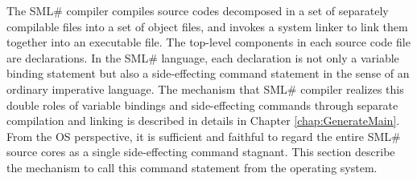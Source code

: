 \documentclass{jbook}
\newcommand{\smlsharp}{SML\#}
\begin{document}
	The \smlsharp{} compiler compiles source codes decomposed in a
set of separately compilable files into a set of object files, and
invokes a system linker to link them together into an executable file.
	The top-level components in each source code file are 
declarations.
	In the \smlsharp{} language, each declaration is not only a
variable binding statement but also a side-effecting command 
statement in the sense of an ordinary imperative language.
	The mechanism that \smlsharp{} compiler realizes this double
roles of variable bindings and side-effecting commands through separate
compilation and linking is described in details in Chapter
\ref{chap:GenerateMain}.
	From the OS perspective, it is sufficient and faithful to regard
the entire \smlsharp{} source cores as a single side-effecting command
stagnant.
	This section describe the mechanism to call this command
statement from the operating system.
\fi%
\end{document}
